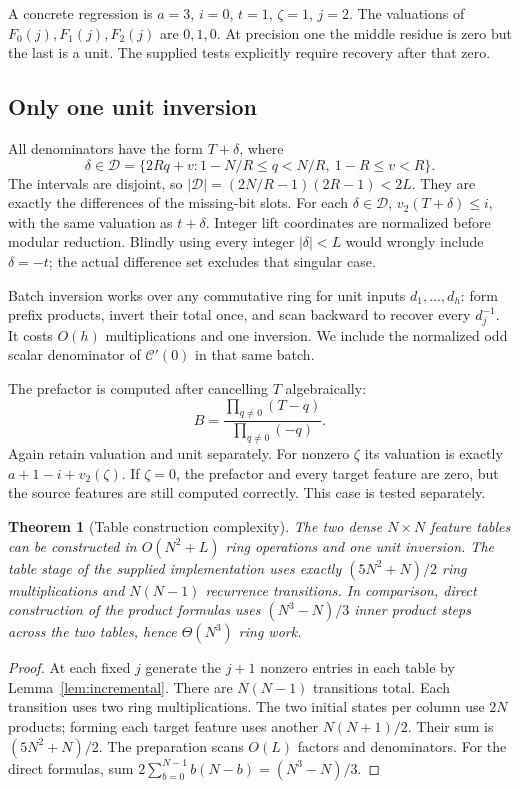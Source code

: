 \documentclass[11pt,letterpaper]{article}
\newtheorem{theorem}{Theorem}[section]
\theoremstyle{definition}\newtheorem{definition}[theorem]{Definition}
\theoremstyle{remark}\newtheorem{remark}[theorem]{Remark}
\newcommand{\vtwo}{v_2}
\begin{document}
A concrete regression is $a=3$, $i=0$, $t=1$, $\zeta=1$, $j=2$.
The valuations of $F_0(j),F_1(j),F_2(j)$ are $0,1,0$.
At precision one the middle residue is zero but the last is a unit.
The supplied tests explicitly require recovery after that zero.

\subsection{Only one unit inversion}

All denominators have the form $T+\delta$, where
\[
 \delta\in\mathcal D=
 \{2Rq+v:1-N/R\le q<N/R,\ 1-R\le v<R\}.
\]
The intervals are disjoint, so
$|\mathcal D|=(2N/R-1)(2R-1)<2L$.
They are exactly the differences of the missing-bit slots. For each
$\delta\in\mathcal D$, $\vtwo(T+\delta)\le i$, with the same valuation
as $t+\delta$. Integer lift coordinates are normalized before modular
reduction. Blindly using every integer $|\delta|<L$ would wrongly include
$\delta=-t$; the actual difference set excludes that singular case.

Batch inversion works over any commutative ring for unit inputs
$d_1,\ldots,d_h$: form prefix products, invert their total once, and scan
backward to recover every $d_j^{-1}$. It costs $O(h)$ multiplications and
one inversion. We include the normalized odd scalar denominator of
$\mathcal C'(0)$ in that same batch.

The prefactor is computed after cancelling $T$ algebraically:
\[
 B=\frac{\prod_{q\ne0}(T-q)}{\prod_{q\ne0}(-q)}.
\]
Again retain valuation and unit separately. For nonzero $\zeta$ its
valuation is exactly $a+1-i+\vtwo(\zeta)$. If $\zeta=0$, the prefactor
and every target feature are zero, but the source features are still
computed correctly. This case is tested separately.

\begin{theorem}[Table construction complexity]\label{thm:kernel}
The two dense $N\times N$ feature tables can be constructed in
$O(N^2+L)$ ring operations and one unit inversion. The table stage of the
supplied implementation uses exactly $(5N^2+N)/2$ ring multiplications
and $N(N-1)$ recurrence transitions. In comparison, direct construction
of the product formulas uses $(N^3-N)/3$ inner product steps across the
two tables, hence $\Theta(N^3)$ ring work.
\end{theorem}
\begin{proof}
At each fixed $j$ generate the $j+1$ nonzero entries in each table by
Lemma~\ref{lem:incremental}. There are $N(N-1)$ transitions total.
Each transition uses two ring multiplications. The two initial states
per column use $2N$ products; forming each target feature uses another
$N(N+1)/2$. Their sum is $(5N^2+N)/2$.
The preparation scans $O(L)$ factors and denominators. For the direct
formulas, sum $2\sum_{b=0}^{N-1}b(N-b)=(N^3-N)/3$.
\end{proof}
\end{document}
